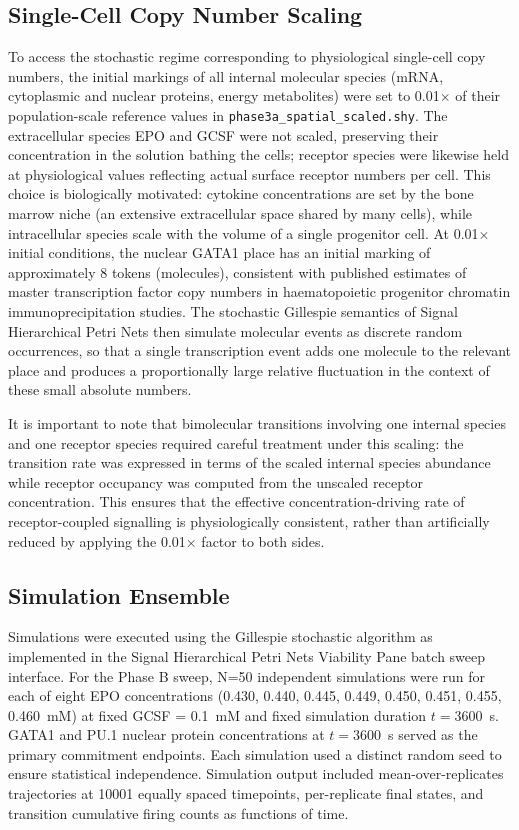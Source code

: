 \subsection{Single-Cell Copy Number Scaling}

To access the stochastic regime corresponding to physiological single-cell copy numbers, the initial markings of all internal molecular species (mRNA, cytoplasmic and nuclear proteins, energy metabolites) were set to 0.01$\times$ of their population-scale reference values in \texttt{phase3a\_spatial\_scaled.shy}. The extracellular species EPO and GCSF were not scaled, preserving their concentration in the solution bathing the cells; receptor species were likewise held at physiological values reflecting actual surface receptor numbers per cell. This choice is biologically motivated: cytokine concentrations are set by the bone marrow niche (an extensive extracellular space shared by many cells), while intracellular species scale with the volume of a single progenitor cell. At 0.01$\times$ initial conditions, the nuclear GATA1 place has an initial marking of approximately 8 tokens (molecules), consistent with published estimates of master transcription factor copy numbers in haematopoietic progenitor chromatin immunoprecipitation studies. The stochastic Gillespie semantics of Signal Hierarchical Petri Nets then simulate molecular events as discrete random occurrences, so that a single transcription event adds one molecule to the relevant place and produces a proportionally large relative fluctuation in the context of these small absolute numbers.

It is important to note that bimolecular transitions involving one internal species and one receptor species required careful treatment under this scaling: the transition rate was expressed in terms of the scaled internal species abundance while receptor occupancy was computed from the unscaled receptor concentration. This ensures that the effective concentration-driving rate of receptor-coupled signalling is physiologically consistent, rather than artificially reduced by applying the 0.01$\times$ factor to both sides.

\subsection{Simulation Ensemble}

Simulations were executed using the Gillespie stochastic algorithm as implemented in the Signal Hierarchical Petri Nets Viability Pane batch sweep interface. For the Phase B sweep, N=50 independent simulations were run for each of eight EPO concentrations (0.430, 0.440, 0.445, 0.449, 0.450, 0.451, 0.455, 0.460~mM) at fixed GCSF = 0.1~mM and fixed simulation duration $t = 3600$~s. GATA1 and PU.1 nuclear protein concentrations at $t = 3600$~s served as the primary commitment endpoints. Each simulation used a distinct random seed to ensure statistical independence. Simulation output included mean-over-replicates trajectories at 10001 equally spaced timepoints, per-replicate final states, and transition cumulative firing counts as functions of time.

